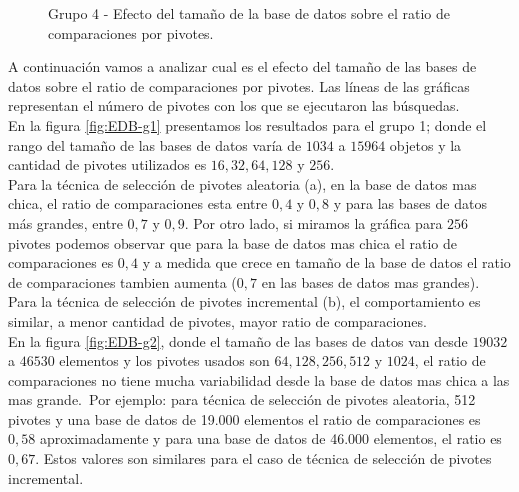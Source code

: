 \begin{figure}[tb]
\centering
{}
		\caption{\small Grupo 4 - Efecto del tamaño de la base de datos sobre el ratio de comparaciones por pivotes.}
		\label{fig:EDB-g4}
\end{figure}
 
A continuaci\'on vamos a analizar cual es el efecto del tama\~no de las bases de datos sobre el ratio de comparaciones por pivotes. Las l\'ineas de las gr\'aficas representan el n\'umero de pivotes con los que se ejecutaron las b\'usquedas.\\

En la figura \ref{fig:EDB-g1} presentamos los resultados para el grupo 1; donde el rango del tama\~no de las bases de datos varía de $1034$ a $15964$ objetos y la cantidad de pivotes utilizados es $16, 32, 64, 128$ y $256$.\\

Para la t\'ecnica de selecci\'on de pivotes aleatoria (a), en la base de datos mas chica, el ratio de comparaciones esta entre $0,4$ y $0,8$ y para las bases de datos m\'as grandes, entre $0,7$ y $0,9$. Por otro lado, si miramos la gr\'afica para $256$ pivotes podemos observar que para la base de datos mas chica el ratio de comparaciones es $0,4$ y a medida que crece en tama\~no de la base de datos el ratio de comparaciones tambien aumenta ($0,7$ en las bases de datos mas grandes).\\

Para la t\'ecnica de selecci\'on de pivotes incremental (b), el comportamiento es similar, a menor cantidad de pivotes, mayor ratio de comparaciones.\\

En la figura \ref{fig:EDB-g2}, donde el tama\~no de las bases de datos van desde $19032$ a $46530$ elementos y los pivotes usados son $64, 128, 256, 512$ y $1024$, el ratio de comparaciones no tiene mucha variabilidad desde la base de datos mas chica a las mas grande.\
Por ejemplo: para t\'ecnica de selecci\'on de pivotes aleatoria, 512 pivotes y una base de datos de 19.000 elementos el ratio de comparaciones es $0,58$ aproximadamente y para una base de datos de 46.000 elementos, el ratio es $0,67$. Estos valores son similares para el caso de t\'ecnica de selecci\'on de pivotes incremental.\\

